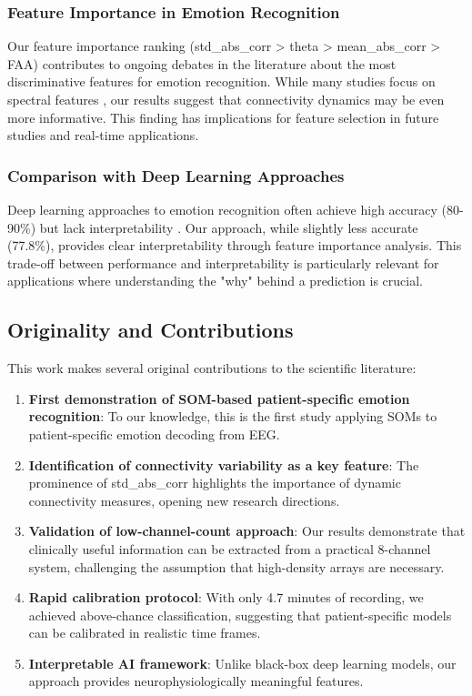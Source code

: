 \subsubsection{Feature Importance in Emotion Recognition}

Our feature importance ranking (std\_abs\_corr > theta > mean\_abs\_corr > FAA) contributes to ongoing debates in the literature about the most discriminative features for emotion recognition. While many studies focus on spectral features \cite{liu2024graph_eeg_emotion}, our results suggest that connectivity dynamics may be even more informative. This finding has implications for feature selection in future studies and real-time applications.

\subsubsection{Comparison with Deep Learning Approaches}

Deep learning approaches to emotion recognition often achieve high accuracy (80-90\%) but lack interpretability \cite{ma2024deep_review}. Our approach, while slightly less accurate (77.8\%), provides clear interpretability through feature importance analysis. This trade-off between performance and interpretability is particularly relevant for applications where understanding the "why" behind a prediction is crucial.

\subsection{Originality and Contributions}

This work makes several original contributions to the scientific literature:

\begin{enumerate}
    \item \textbf{First demonstration of SOM-based patient-specific emotion recognition}: To our knowledge, this is the first study applying SOMs to patient-specific emotion decoding from EEG.
    
    \item \textbf{Identification of connectivity variability as a key feature}: The prominence of std\_abs\_corr highlights the importance of dynamic connectivity measures, opening new research directions.
    
    \item \textbf{Validation of low-channel-count approach}: Our results demonstrate that clinically useful information can be extracted from a practical 8-channel system, challenging the assumption that high-density arrays are necessary.
    
    \item \textbf{Rapid calibration protocol}: With only 4.7 minutes of recording, we achieved above-chance classification, suggesting that patient-specific models can be calibrated in realistic time frames.
    
    \item \textbf{Interpretable AI framework}: Unlike black-box deep learning models, our approach provides neurophysiologically meaningful features.
\end{enumerate}

